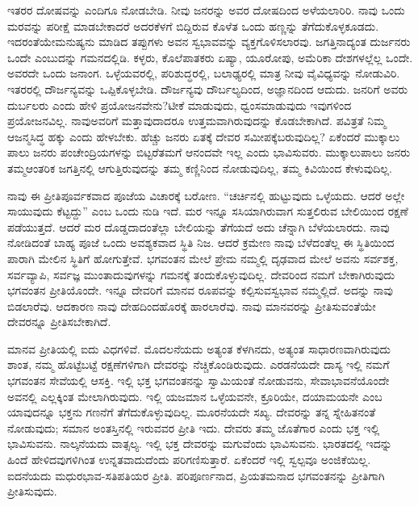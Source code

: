 \vskip 6pt

ಇತರರ ದೋಷವನ್ನು ಎಂದಿಗೂ ನೋಡಬೇಡಿ. ನೀವು ಜನರನ್ನು ಅವರ ದೋಷದಿಂದ ಅಳೆಯಲಾರಿರಿ. ನಾವು ಒಂದು ಮರವನ್ನು ಪರೀಕ್ಷೆ ಮಾಡಬೇಕಾದರೆ ಅದರ\break ಕೆಳಗೆ ಬಿದ್ದಿರುವ ಕೊಳೆತ ಒಂದು ಹಣ್ಣನ್ನು ತೆಗೆದುಕೊಳ್ಳಕೂಡದು. ಇದರಂತೆಯೇ\break ಮನುಷ್ಯನು ಮಾಡಿದ ತಪ್ಪುಗಳು ಅವನ ಸ್ವಭಾವವನ್ನು ವ್ಯಕ್ತಗೊಳಿಸಲಾರವು. ಜಗತ್ತಿನಾದ್ಯಂತ ದುರ್ಜನರು ಒಂದೇ ಎಂಬುದನ್ನು ಗಮನದಲ್ಲಿಡಿ. ಕಳ್ಳರು, ಕೊಲೆಪಾತಕರು ಏಷ್ಯಾ, ಯೂರೋಪು, ಅಮೆರಿಕಾ ದೇಶಗಳಲ್ಲೆಲ್ಲ ಒಂದೇ. ಅವರದೇ ಒಂದು ಜನಾಂಗ. ಒಳ್ಳೆಯವರಲ್ಲಿ, ಪರಿಶುದ್ಧರಲ್ಲಿ, ಬಲಾಢ್ಯರಲ್ಲಿ ಮಾತ್ರ ನೀವು ವೈವಿಧ್ಯವನ್ನು ನೋಡುವಿರಿ. ಇತರರಲ್ಲಿ ದೌರ್ಜನ್ಯವನ್ನು ಒಪ್ಪಿಕೊಳ್ಳಬೇಡಿ. ದೌರ್ಜನ್ಯವು ದೌರ್ಬಲ್ಯದಿಂದ, ಅಜ್ಞಾನದಿಂದ ಆದುದು. ಜನರಿಗೆ ಅವರು ದುರ್ಬಲರು ಎಂದು ಹೇಳಿ ಪ್ರಯೋಜನವೇನು?\break ಟೀಕೆ ಮಾಡುವುದು, ಧ್ವಂಸಮಾಡುವುದು ಇವುಗಳಿಂದ ಪ್ರಯೋಜನವಿಲ್ಲ. ನಾವು\break ಅವರಿಗೆ ಮತ್ತಾವುದಾದರೂ ಉತ್ತಮವಾಗಿರುವುದನ್ನು ಕೊಡಬೇಕಾಗಿದೆ. ಪವಿತ್ರತೆ ನಿಮ್ಮ ಆಜನ್ಮಸಿದ್ಧ ಹಕ್ಕು ಎಂದು ಹೇಳಬೇಕು. ಹೆಚ್ಚು ಜನರು ಏತಕ್ಕೆ ದೇವರ ಸಮೀಪಕ್ಕೆ\break ಬರುವುದಿಲ್ಲ? ಏಕೆಂದರೆ ಮುಕ್ಕಾಲು ಪಾಲು ಜನರು ಪಂಚೇಂದ್ರಿಯಗಳನ್ನು ಬಿಟ್ಟರೆ\break ತಮಗೆ ಆನಂದವೇ ಇಲ್ಲ ಎಂದು ಭಾವಿಸುವರು. ಮುಕ್ಕಾಲುಪಾಲು ಜನರು ತಮ್ಮ\break ಆಂತರಿಕ ಜಗತ್ತಿನಲ್ಲಿ ಆಗುತ್ತಿರುವುದನ್ನು ತಮ್ಮ ಕಣ್ಣಿನಿಂದ ನೋಡುವುದಿಲ್ಲ, ತಮ್ಮ ಕಿವಿಯಿಂದ ಕೇಳುವುದಿಲ್ಲ.

\vskip 6pt

ನಾವು ಈ ಪ್ರೀತಿಪೂರ್ವಕವಾದ ಪೂಜೆಯ ವಿಚಾರಕ್ಕೆ ಬರೋಣ. “ಚರ್ಚಿನಲ್ಲಿ ಹುಟ್ಟುವುದು ಒಳ್ಳೆಯದು. ಆದರೆ ಅಲ್ಲೇ ಸಾಯುವುದು ಕೆಟ್ಟದ್ದು” ಎಂಬ ಒಂದು ನುಡಿ ಇದೆ. ಮರ ಇನ್ನೂ ಸಸಿಯಾಗಿರುವಾಗ ಸುತ್ತಲಿರುವ ಬೇಲಿಯಿಂದ ರಕ್ಷಣೆ ಪಡೆಯುತ್ತದೆ. ಆದರೆ ಮರ ದೊಡ್ಡದಾದಂತೆಲ್ಲಾ ಬೇಲಿಯನ್ನು ತೆಗೆಯದೆ ಅದು ಚೆನ್ನಾಗಿ ಬೆಳೆಯಲಾರದು. ನಾವು ನೋಡಿದಂತೆ ಬಾಹ್ಯ ಪೂಜೆ ಒಂದು ಅವಶ್ಯಕವಾದ ಸ್ಥಿತಿ ನಿಜ. ಆದರೆ ಕ್ರಮೇಣ ನಾವು ಬೆಳೆದಂತೆಲ್ಲ ಈ ಸ್ಥಿತಿಯಿಂದ ಪಾರಾಗಿ ಮೇಲಿನ ಸ್ಥಿತಿಗೆ ಹೋಗುತ್ತೇವೆ. ಭಗವಂತನ ಮೇಲೆ ಪ್ರೇಮ ನಮ್ಮಲ್ಲಿ ದೃಢವಾದ ಮೇಲೆ ಅವನು ಸರ್ವಶಕ್ತ, ಸರ್ವವ್ಯಾಪಿ, ಸರ್ವಜ್ಞ ಮುಂತಾದುವುಗಳನ್ನು ಗಮನಕ್ಕೆ ತಂದುಕೊಳ್ಳುವುದಿಲ್ಲ. ದೇವರಿಂದ ನಮಗೆ ಬೇಕಾಗಿರುವುದು ಭಗವಂತನ ಪ್ರೀತಿಯೊಂದೇ. ಇನ್ನೂ ದೇವರಿಗೆ ಮಾನವ ರೂಪವನ್ನು ಕಲ್ಪಿಸುವ\break ಸ್ವಭಾವ ನಮ್ಮಲ್ಲಿದೆ. ಅದನ್ನು ನಾವು ಬಿಡಲಾರೆವು. ಆದಕಾರಣ ನಾವು ದೇಹದಿಂದ\break ಹೊರಕ್ಕೆ ಹಾರಲಾರೆವು. ನಾವು ಮಾನವರನ್ನು ಪ್ರೀತಿಸುವಂತೆಯೇ ದೇವರನ್ನೂ ಪ್ರೀತಿಸಬೇಕಾಗಿದೆ.

\vskip 6pt

ಮಾನವ ಪ್ರೀತಿಯಲ್ಲಿ ಐದು ವಿಧಗಳಿವೆ. ಮೊದಲನೆಯದು ಅತ್ಯಂತ ಕೆಳಗಿನದು, ಅತ್ಯಂತ ಸಾಧಾರಣವಾಗಿರುವುದು ಶಾಂತ, ನಮ್ಮ ಹೊಟ್ಟೆಬಟ್ಟೆ ರಕ್ಷಣೆಗಳಿಗಾಗಿ ದೇವರನ್ನು ನೆಚ್ಚಿಕೊಂಡಿರುವುದು. ಎರಡನೆಯದೇ ದಾಸ್ಯ ಇಲ್ಲಿ ನಮಗೆ ಭಗವಂತನ ಸೇವೆಯಲ್ಲಿ ಆಸಕ್ತಿ. ಇಲ್ಲಿ ಭಕ್ತ ಭಗವಂತನನ್ನು ಸ್ವಾಮಿಯಂತೆ ನೋಡುವನು, ಸೇವಾಭಾವನೆಯೊಂದೇ ಅವನಲ್ಲಿ ಎಲ್ಲಕ್ಕಿಂತ ಮೇಲಾಗಿರುವುದು. ಇಲ್ಲಿ ಯಜಮಾನ ಒಳ್ಳೆಯವನೇ, ಕ್ರೂರಿಯೇ, ದಯಾಮಯನೇ ಎಂಬ ಯಾವುದನ್ನೂ ಭಕ್ತನು ಗಣನೆಗೆ ತೆಗೆದುಕೊಳ್ಳುವುದಿಲ್ಲ. ಮೂರನೆಯದೇ ಸಖ್ಯ. ದೇವರನ್ನು ತನ್ನ ಸ್ನೇಹಿತನಂತೆ ನೋಡುವುದು; ಸಮಾನ ಅಂತಸ್ತಿನಲ್ಲಿ ಇರುವವರ ಪ್ರೀತಿ ಇದು. ದೇವರು ತಮ್ಮ ಜೊತೆಗಾರ ಎಂದು ಭಕ್ತ ಇಲ್ಲಿ ಭಾವಿಸುವನು. ನಾಲ್ಕನೆಯದು ವಾತ್ಸಲ್ಯ. ಇಲ್ಲಿ ಭಕ್ತ ದೇವರನ್ನು ಮಗುವೆಂದು ಭಾವಿಸುವನು. ಭಾರತದಲ್ಲಿ ಇದನ್ನು ಹಿಂದೆ ಹೇಳಿದವುಗಳಿಗಿಂತ ಉನ್ನತವಾದುದೆಂದು ಪರಿಗಣಿಸುತ್ತಾರೆ. ಏಕೆಂದರೆ ಇಲ್ಲಿ ಸ್ವಲ್ಪವೂ ಅಂಜಿಕೆಯಿಲ್ಲ. ಐದನೆಯದು ಮಧುರಭಾವ-ಸತಿಪತಿಯರ ಪ್ರೀತಿ. ಪರಿಪೂರ್ಣನಾದ, ಪ್ರಿಯತಮನಾದ ಭಗವಂತನನ್ನು ಪ್ರೀತಿಗಾಗಿ ಪ್ರೀತಿಸುವುದು.

